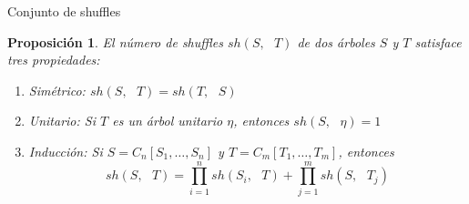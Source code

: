\documentclass[12pt,aspectratio=169]{beamer}
\numberwithin{equation}{section}
\newtheorem{prop}[teo]{Proposici\'on}
\theoremstyle{definition}
\begin{document}
\begin{frame}{Conjunto de shuffles}
    \begin{prop}
        El n\'umero de shuffles $sh(S,\text{ }T)$ de dos \'arboles $S$ y $T$ satisface tres propiedades:
        \begin{enumerate}
            \item[{\rm (i)}] Sim\'etrico: $sh(S, \text{ }T) = sh(T, \text{ }S)$
            \item[{\rm (ii)}] Unitario: Si $T$ es un \'arbol unitario $\eta$, entonces $sh(S, \text{ }\eta)=1$
            \item[{\rm (iii)}] Inducci\'on: Si $S=C_n[S_1,\dots,S_n]$ y $T=C_m[T_1,\dots,T_m]$, entonces
                  $$
                      sh(S, \text{ }T)  = \prod_{i=1}^n sh(S_i, \text{ }T) + \prod_{j=1}^m sh(S, \text{ }T_j)
                  $$
        \end{enumerate}
    \end{prop}
\end{frame}
\end{document}
